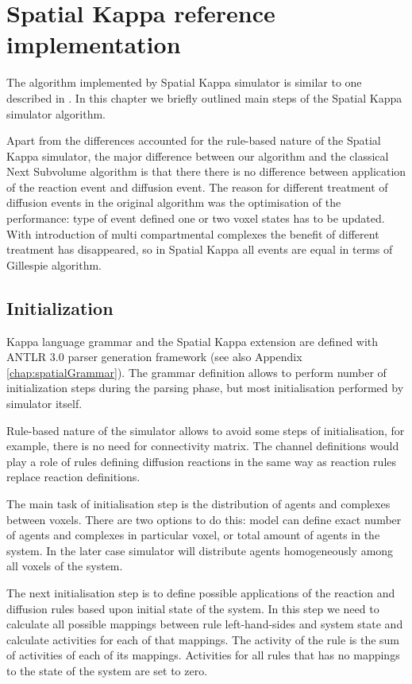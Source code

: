 \chapter{Spatial Kappa reference implementation}

The algorithm implemented by Spatial Kappa simulator is similar to one described in \cite{Elf:2004fv}. In this chapter we briefly outlined main steps of the Spatial Kappa simulator algorithm.

Apart from the differences accounted for the rule-based nature of the Spatial Kappa simulator, the major difference between our algorithm and the classical Next Subvolume algorithm is that there there is no difference between application of the reaction event and diffusion event. The reason for different treatment of diffusion events in the original algorithm was the optimisation of the performance: type of event defined one or two voxel states has to be updated. With introduction of multi compartmental complexes the benefit of different treatment has disappeared, so in Spatial Kappa all events are equal in terms of Gillespie algorithm. 

\section{Initialization}
Kappa language grammar and the Spatial Kappa extension are defined with ANTLR 3.0 parser generation framework (see also Appendix \ref{chap:spatialGrammar}). The grammar definition allows to perform number of initialization steps during the parsing phase, but most initialisation performed by simulator itself.

Rule-based nature of the simulator allows to avoid some steps of initialisation, for example, there is no need for connectivity matrix. The channel definitions would play a role of rules defining diffusion reactions in the same way as reaction rules replace reaction definitions.

The main task of initialisation step is the distribution of agents and complexes between voxels. There are two options to do this: model can define exact number of agents and complexes in particular voxel, or total amount of agents in the system. In the later case simulator will distribute agents homogeneously among all voxels of the system.

The next initialisation step is to define possible applications of the reaction and diffusion rules based upon initial state of the system. In this step we need to calculate all possible mappings between rule left-hand-sides and system state and calculate activities for each of that mappings. The activity of the rule is the sum of activities of each of its mappings. Activities for all rules that has no mappings to the state of the system are set to zero.

